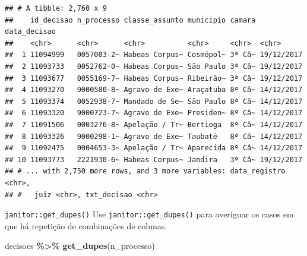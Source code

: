 \documentclass[
  10pt,
  ignorenonframetext,
]{beamer}
\newenvironment{Shaded}{\begin{snugshade}}{\end{snugshade}}
\newcommand{\KeywordTok}[1]{\textcolor[rgb]{0.13,0.29,0.53}{\textbf{#1}}}
\newcommand{\NormalTok}[1]{#1}
\newcommand{\OperatorTok}[1]{\textcolor[rgb]{0.81,0.36,0.00}{\textbf{#1}}}
\newcommand{\StringTok}[1]{\textcolor[rgb]{0.31,0.60,0.02}{#1}}
\begin{document}
\begin{frame}[fragile]{}
\protect\hypertarget{section-8}{}
\begin{verbatim}
## # A tibble: 2,760 x 9
##    id_decisao n_processo classe_assunto municipio camara data_decisao
##    <chr>      <chr>      <chr>          <chr>     <chr>  <chr>       
##  1 11094999   0057003-2~ Habeas Corpus~ Cosmópol~ 3ª Câ~ 19/12/2017  
##  2 11093733   0052762-0~ Habeas Corpus~ São Paulo 3ª Câ~ 19/12/2017  
##  3 11093677   0055169-7~ Habeas Corpus~ Ribeirão~ 3ª Câ~ 19/12/2017  
##  4 11093270   9000580-8~ Agravo de Exe~ Araçatuba 8ª Câ~ 14/12/2017  
##  5 11093374   0052938-7~ Mandado de Se~ São Paulo 8ª Câ~ 14/12/2017  
##  6 11093320   9000723-7~ Agravo de Exe~ Presiden~ 8ª Câ~ 14/12/2017  
##  7 11091506   0003276-8~ Apelação / Tr~ Bertioga  8ª Câ~ 14/12/2017  
##  8 11093326   9000298-1~ Agravo de Exe~ Taubaté   8ª Câ~ 14/12/2017  
##  9 11092475   0004653-3~ Apelação / Tr~ Aparecida 8ª Câ~ 14/12/2017  
## 10 11093773   2221930-6~ Habeas Corpus~ Jandira   3ª Câ~ 19/12/2017  
## # ... with 2,750 more rows, and 3 more variables: data_registro <chr>,
## #   juiz <chr>, txt_decisao <chr>
\end{verbatim}
\end{frame}

\begin{frame}[fragile]{\texttt{janitor::get\_dupes()}}
\protect\hypertarget{janitorget_dupes-1}{}
Use \texttt{janitor::get\_dupes()} para averiguar os casos em que há
repetição de combinações de colunas.

\begin{Shaded}
\begin{Highlighting}[]
\NormalTok{decisoes }\OperatorTok{\%\textgreater{}\%}\StringTok{ }
\StringTok{  }\KeywordTok{get\_dupes}\NormalTok{(n\_processo)}
\end{Highlighting}
\end{Shaded}
\end{frame}
\end{document}

